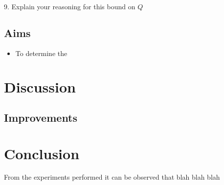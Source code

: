 \documentclass[8pt]{article}
\begin{document}
9. Explain your reasoning for this bound on $Q$


\subsection{Aims}

\begin{itemize}
\item To determine the 
\end{itemize}

\newpage

\section{Discussion}


\subsection{Improvements}

\section{Conclusion}

From the experiments performed it can be observed that blah blah blah
\end{document}
